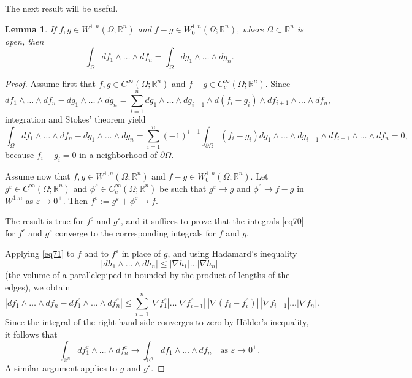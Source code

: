 \documentclass[intlimits,12pt,reqno]{amsart}
\newcommand{\bbbr}{\mathbb R}
\newcommand{\R}{\mathbb R}
\newcommand{\eps}{\varepsilon}
\numberwithin{equation}{section}
\newtheorem{lemma}[theorem]{Lemma}
\theoremstyle{definition}
\begin{document}
The next result will be useful.
\begin{lemma}
\label{T61}
If $f,g\in W^{1,n}(\Omega;\R^n)$ and $f-g\in W_0^{1,n}(\Omega;\R^n)$, where $\Omega\subset\R^n$ is open, then
\begin{equation}
\label{eq70}
\int_\Omega df_1\wedge\ldots\wedge df_n=\int_\Omega dg_1\wedge\ldots\wedge dg_n.
\end{equation}
\end{lemma}
\begin{proof}
Assume first that $f,g\in C^\infty(\Omega;\bbbr^n)$ and $f-g\in C_c^\infty(\Omega;\bbbr^n)$.
Since
\begin{equation}
\label{eq71}
df_1\wedge\ldots\wedge df_n-dg_1\wedge\ldots\wedge dg_n=
\sum_{i=1}^n dg_1\wedge\ldots\wedge dg_{i-1}\wedge d(f_i-g_i)\wedge df_{i+1}\wedge\ldots\wedge df_n,
\end{equation}
integration and Stokes' theorem yield
$$
\int_\Omega df_1\wedge\ldots\wedge df_n-dg_1\wedge\ldots\wedge dg_n=
\sum_{i=1}^n(-1)^{i-1}\int_{\partial\Omega}
(f_i-g_i)dg_1\wedge\ldots\wedge dg_{i-1}\wedge df_{i+1}\wedge\ldots\wedge df_n=0,
$$
because $f_i-g_i=0$ in a neighborhood of $\partial\Omega$.

Assume now that  $f,g\in W^{1,n}(\Omega;\R^n)$ and $f-g\in W_0^{1,n}(\Omega;\R^n)$. Let
$g^\eps\in C^\infty(\Omega;\bbbr^n)$ and $\phi^\eps\in C_c^\infty(\Omega;\bbbr^n)$ be such that $g^\eps\to g$ and $\phi^\eps\to f-g$ in $W^{1,n}$ as $\eps\to 0^+$. Then $f^\eps:=g^\eps+\phi^\eps\to f$. 

The result is true for $f^\eps$ and $g^\eps$, and it suffices to prove that the integrals \eqref{eq70} for $f^\eps$ and $g^\eps$ converge to the corresponding integrals for $f$ and $g$.

Applying \eqref{eq71} to $f$ and to $f^\eps$ in place of $g$, and using Hadamard's inequality
$$
|dh_1\wedge\ldots\wedge dh_n|\leq |\nabla h_1|\ldots|\nabla h_n|
$$
(the volume of a parallelepiped in bounded by the product of lengths of the edges), we obtain
\begin{equation}
\label{eq78}
|df_1\wedge\ldots\wedge df_n-df^\eps_1\wedge\ldots\wedge df^\eps_n|\leq
\sum_{i=1}^n |\nabla f^\eps_1|\ldots|\nabla f^\eps_{i-1}|\, |\nabla(f_i-f^\eps_i)|\,|\nabla f_{i+1}|\ldots |\nabla f_n|.
\end{equation}
Since the integral of the right hand side converges to zero by H\"older's inequality, it follows that
\begin{equation}
\label{eq73}
\int_{\bbbr^n} df^\eps_1\wedge\ldots\wedge df^\eps_n\to
\int_{\bbbr^n} df_1\wedge\ldots\wedge df_n
\quad
\text{as $\eps\to 0^+$.}
\end{equation}
A similar argument applies to $g$ and $g^\eps$.
\end{proof}
\end{document}
